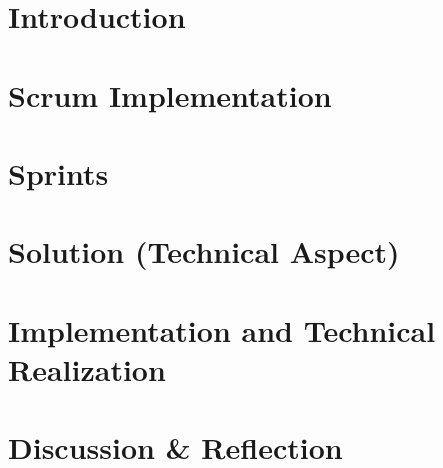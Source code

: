 \documentclass[12pt, a4paper]{report}
\begin{document}
\newpage
{}

\chapter{Introduction}


\chapter{Scrum Implementation}


\chapter{Sprints}


\chapter{Solution (Technical Aspect)}


\chapter{Implementation and Technical Realization}


\chapter{Discussion \& Reflection}

\end{document}
